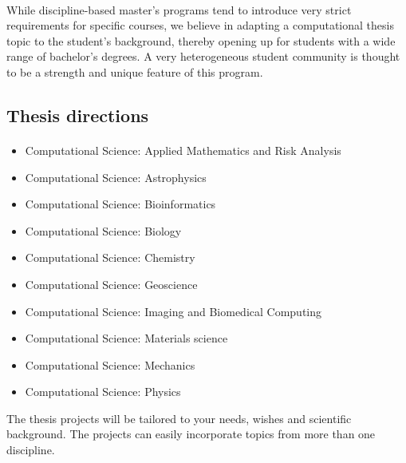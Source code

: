 \documentclass[%
oneside,                 %
final,                   %
10pt]{article}
\begin{document}
\paragraph{}
While discipline-based master's programs tend to introduce very strict
requirements for specific courses, we believe in adapting a computational thesis
topic to the student's background, thereby opening up for
students with a wide range of bachelor's degrees.
A very heterogeneous student community is thought to be a strength and
unique feature of this program.





\subsection{Thesis directions}

\paragraph{}

\begin{itemize}
\item Computational Science: Applied Mathematics and Risk Analysis

\item Computational Science: Astrophysics

\item Computational Science: Bioinformatics

\item Computational Science: Biology

\item Computational Science: Chemistry

\item Computational Science: Geoscience

\item Computational Science: Imaging and Biomedical Computing

\item Computational Science: Materials science

\item Computational Science: Mechanics

\item Computational Science: Physics
\end{itemize}

\noindent
The thesis projects will be tailored to your needs, wishes and scientific background. The projects can easily incorporate topics from more than one discipline.
\end{document}
